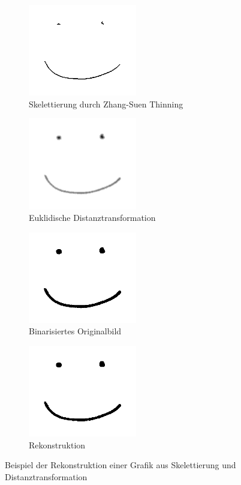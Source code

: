 \begin{figure}[h]
    \begin{subfigure}[t]{0.45\textwidth}
        \centering
        \includegraphics[height=4cm,interpolate=false]{images/theory_preprocess_skeleton}
        \caption{Skelettierung durch Zhang-Suen Thinning}%
        \label{fig:theory_preprocess_skeleton}
    \end{subfigure}
    \hfill
    \begin{subfigure}[t]{0.45\textwidth}
        \centering
        \includegraphics[height=4cm]{images/theory_preprocess_distance}
        \caption{Euklidische Distanztransformation}%
        \label{fig:theory_preprocess_distance}
    \end{subfigure}

    \begin{subfigure}[t]{0.45\textwidth}
        \centering
        \includegraphics[height=4cm]{images/essentials_binarization_sauvola}
        \caption{Binarisiertes Originalbild}
    \end{subfigure}
    \hfill
    \begin{subfigure}[t]{0.45\textwidth}
        \centering
        \includegraphics[height=4cm]{images/theory_preprocess_reconstructed}
        \caption{Rekonstruktion}%
        \label{fig:theory_preprocess_reconstructed}
    \end{subfigure}
    \caption{Beispiel der Rekonstruktion einer Grafik aus Skelettierung und Distanztransformation}
\end{figure}

